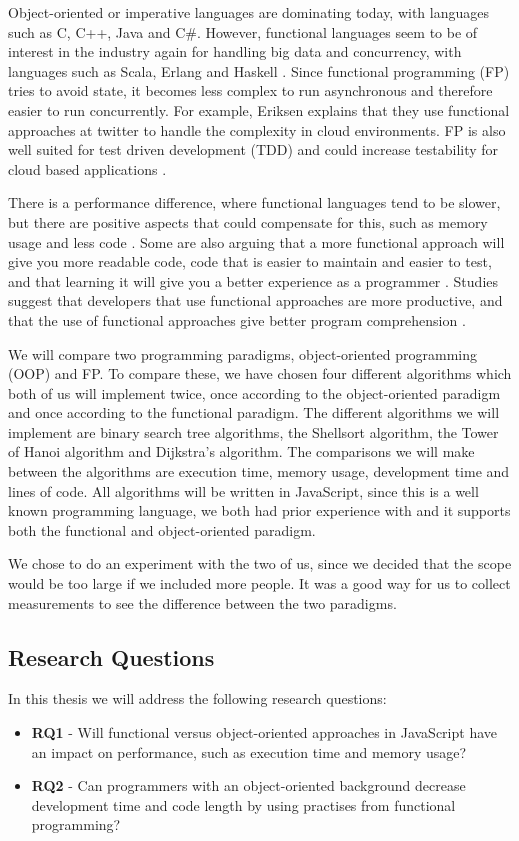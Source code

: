 \documentclass {article}
\begin{document}
Object-oriented or imperative languages are dominating today, with languages such as C, C++, Java and C\#. However, functional languages seem to be of interest in the industry again for handling big data and concurrency, with languages such as Scala, Erlang and Haskell \cite{drboolean, eriksen, erikarl, alomgi}. Since functional programming (FP) tries to avoid state, it becomes less complex to run asynchronous and therefore easier to run concurrently. For example, Eriksen \cite{eriksen} explains that they use functional approaches at twitter to handle the complexity in cloud environments. FP is also well suited for test driven development (TDD) and could increase testability for cloud based applications \cite{benrad}. 
 
There is a performance difference, where functional languages tend to be slower, but there are positive aspects that could compensate for this, such as memory usage and less code \cite{fogus, alomgi}. Some are also arguing that a more functional approach will give you more readable code, code that is easier to maintain and easier to test, and that learning it will give you a better experience as a programmer \cite{drboolean, meijer}. Studies suggest that developers that use functional approaches are more productive, and that the use of functional approaches give better program comprehension \cite{saproamname, scomad}. 
 
We will compare two programming paradigms, object-oriented programming (OOP) and FP. To compare these, we have chosen four different algorithms which both of us will implement twice, once according to the object-oriented paradigm and once according to the functional paradigm. The different algorithms we will implement are binary search tree algorithms, the Shellsort algorithm, the Tower of Hanoi algorithm and Dijkstra's algorithm. The comparisons we will make between the algorithms are execution time, memory usage, development time and lines of code. All algorithms will be written in JavaScript, since this is a well known programming language, we both had prior experience with and it supports both the functional and object-oriented paradigm. 
 
We chose to do an experiment with the two of us, since we decided that the scope would be too large if we included more people. It was a good way for us to collect measurements to see the difference between the two paradigms.
\subsection{Research Questions}
In this thesis we will address the following research questions:
\begin{itemize}
\item \textbf{RQ1} - Will functional versus object-oriented approaches in JavaScript have an impact on performance, such as execution time and memory usage?
\item \textbf{RQ2} - Can programmers with an object-oriented background decrease development time and code length by using practises from functional programming?
\end{itemize}
 
\end{document}
